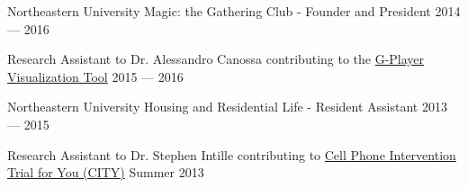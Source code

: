 

Northeastern University Magic: the Gathering Club - Founder and President   \hfill 2014 --- 2016

Research Assistant to Dr. Alessandro Canossa contributing to the \href{https://github.com/spacial-player-data-visualization/g-player-visualization}{G-Player Visualization Tool}   \hfill 2015 --- 2016

Northeastern University Housing and Residential Life - Resident Assistant   \hfill 2013 --- 2015

Research Assistant to Dr. Stephen Intille contributing to \href{https://www.mhealthgroup.org/projects.html}{Cell Phone Intervention Trial for You (CITY)}   \hfill Summer 2013


